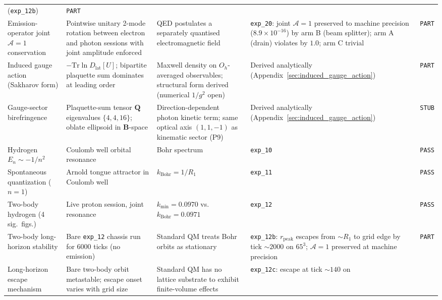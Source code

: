 {\begin{longtable}{@{}p{2.6cm}p{3.8cm}p{3.2cm}p{4.4cm}p{1.0cm}@{}}
      (\texttt{exp\_12b})
    & \texttt{PART} \\
Emission-operator joint $\mathcal{A}=1$ conservation
    & Pointwise unitary 2-mode rotation between electron and photon
      sessions with joint amplitude enforced
    & QED postulates a separately quantised electromagnetic field
    & \texttt{exp\_20}: joint $\mathcal{A}=1$ preserved to
      machine precision ($8.9\!\times\!10^{-16}$) by arm B (beam
      splitter); arm A (drain) violates by $1.0$; arm C trivial
    & \texttt{PART} \\
Induced gauge action (Sakharov form)
    & $-\mathrm{Tr}\ln D_\text{lat}[U]$;
      bipartite plaquette sum dominates at leading order
    & Maxwell density on $O_h$-averaged observables;
      structural form derived (numerical $1/g^2$ open)
    & Derived analytically (Appendix~\ref{sec:induced_gauge_action})
    & \texttt{PART} \\
Gauge-sector birefringence
    & Plaquette-sum tensor $\mathbf{Q}$ eigenvalues $\{4, 4, 16\}$;
      oblate ellipsoid in $\mathbf{B}$-space
    & Direction-dependent photon kinetic term;
      same optical axis $(1,1,-1)$ as kinematic sector (P9)
    & Derived analytically (Appendix~\ref{sec:induced_gauge_action})
    & \texttt{STUB} \\
\hline
Hydrogen $E_n \sim -1/n^2$
    & Coulomb well orbital resonance
    & Bohr spectrum
    & \texttt{exp\_10}
    & \texttt{PASS} \\
Spontaneous quantization ($n=1$)
    & Arnold tongue attractor in Coulomb well
    & $k_\text{Bohr} = 1/R_1$
    & \texttt{exp\_11}
    & \texttt{PASS} \\
Two-body hydrogen (4 sig.\ figs.)
    & Live proton session, joint resonance
    & $k_\text{min} = 0.0970$ vs.\ $k_\text{Bohr} = 0.0971$
    & \texttt{exp\_12}
    & \texttt{PASS} \\
Two-body long-horizon stability
    & Bare \texttt{exp\_12} chassis run for 6000 ticks (no emission)
    & Standard QM treats Bohr orbits as stationary
    & \texttt{exp\_12b}: $r_\text{peak}$ escapes from $\sim R_1$
      to grid edge by tick $\sim 2000$ on $65^3$;
      $\mathcal{A}=1$ preserved at machine precision
    & \texttt{PART} \\
Long-horizon escape mechanism
    & Bare two-body orbit metastable; escape onset varies with
      grid size
    & Standard QM has no lattice substrate to exhibit finite-volume
      effects
    & \texttt{exp\_12c}: escape at tick $\sim 140$ on

\end{longtable}}
